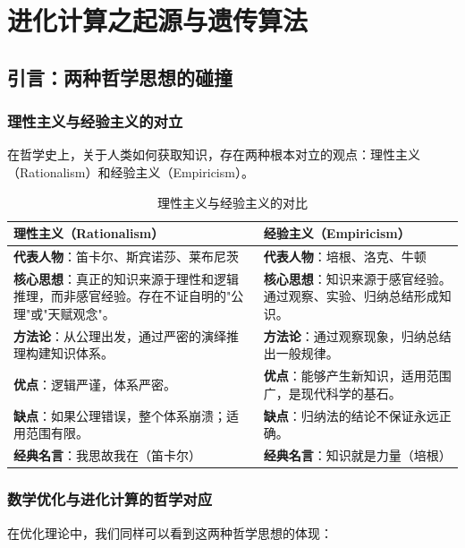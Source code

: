 \chapter{进化计算之起源与遗传算法}
\section{引言：两种哲学思想的碰撞}

\subsection{理性主义与经验主义的对立}

在哲学史上，关于人类如何获取知识，存在两种根本对立的观点：理性主义（Rationalism）和经验主义（Empiricism）。

\begin{table}[H]
\centering
\caption{理性主义与经验主义的对比}
\begin{tabular}{p{}p{}}
\toprule
\textbf{理性主义（Rationalism）} & \textbf{经验主义（Empiricism）} \\
\midrule
\textbf{代表人物}：笛卡尔、斯宾诺莎、莱布尼茨 & \textbf{代表人物}：培根、洛克、牛顿 \\
\hline
\textbf{核心思想}：真正的知识来源于理性和逻辑推理，而非感官经验。存在不证自明的"公理"或"天赋观念"。 & \textbf{核心思想}：知识来源于感官经验。通过观察、实验、归纳总结形成知识。 \\
\hline
\textbf{方法论}：从公理出发，通过严密的演绎推理构建知识体系。 & \textbf{方法论}：通过观察现象，归纳总结出一般规律。 \\
\hline
\textbf{优点}：逻辑严谨，体系严密。 & \textbf{优点}：能够产生新知识，适用范围广，是现代科学的基石。 \\
\hline
\textbf{缺点}：如果公理错误，整个体系崩溃；适用范围有限。 & \textbf{缺点}：归纳法的结论不保证永远正确。 \\
\hline
\textbf{经典名言}：我思故我在（笛卡尔） & \textbf{经典名言}：知识就是力量（培根） \\
\bottomrule
\end{tabular}
\end{table}

\subsection{数学优化与进化计算的哲学对应}

在优化理论中，我们同样可以看到这两种哲学思想的体现：

